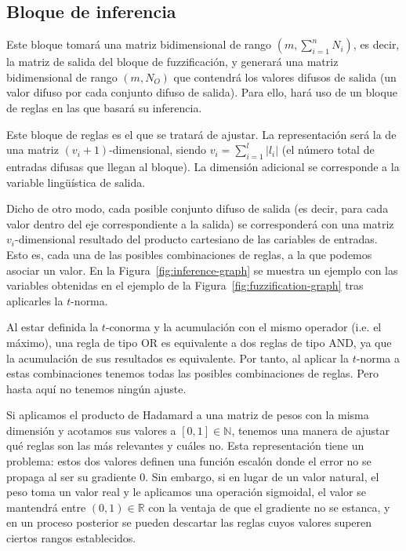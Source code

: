 \subsection{Bloque de inferencia}

Este bloque tomará una matriz bidimensional de rango $(m, \sum_{i=1}^n N_i)$, es decir, la matriz de salida del bloque de fuzzificación, y generará una matriz bidimensional de rango $(m, N_O)$ que contendrá los valores difusos de salida (un valor difuso por cada conjunto difuso de salida). Para ello, hará uso de un bloque de reglas en las que basará su inferencia.

Este bloque de reglas es el que se tratará de ajustar. La representación será la de una matriz $(v_i + 1)$-dimensional, siendo $v_i = \sum_{i=1}^l \left\vert{l_i}\right\vert$ (el número total de entradas difusas que llegan al bloque). La dimensión adicional se corresponde a la variable lingüística de salida.

Dicho de otro modo, cada posible conjunto difuso de salida (es decir, para cada valor dentro del eje correspondiente a la salida) se corresponderá con una matriz $v_i$-dimensional resultado del producto cartesiano de las cariables de entradas. Esto es, cada una de las posibles combinaciones de reglas, a la que podemos asociar un valor. En la Figura~\ref{fig:inference-graph} se muestra un ejemplo con las variables obtenidas en el ejemplo de la Figura~\ref{fig:fuzzification-graph} tras aplicarles la $t$-norma.

Al estar definida la $t$-conorma y la acumulación con el mismo operador (i.e. el máximo), una regla de tipo OR es equivalente a dos reglas de tipo AND, ya que la acumulación de sus resultados es equivalente. Por tanto, al aplicar la $t$-norma a estas combinaciones tenemos todas las posibles combinaciones de reglas. Pero hasta aquí no tenemos ningún ajuste.

Si aplicamos el producto de Hadamard a una matriz de pesos con la misma dimensión y acotamos sus valores a $[0, 1] \in \mathbb{N}$, tenemos una manera de ajustar qué reglas son las más relevantes y cuáles no. Esta representación tiene un problema: estos dos valores definen una función escalón donde el error no se propaga al ser su gradiente $0$. Sin embargo, si en lugar de un valor natural, el peso toma un valor real y le aplicamos una operación sigmoidal, el valor se mantendrá entre $(0, 1) \in \mathbb{R}$ con la ventaja de que el gradiente no se estanca, y en un proceso posterior se pueden descartar las reglas cuyos valores superen ciertos rangos establecidos.

